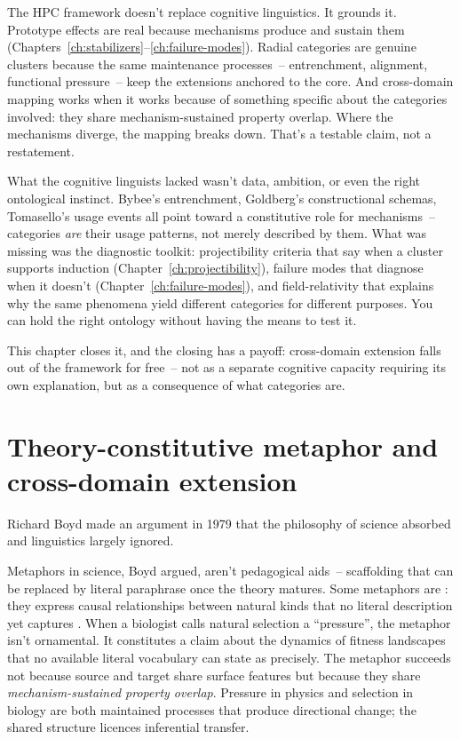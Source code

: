 The HPC framework doesn't replace cognitive linguistics. It grounds it. Prototype effects are real because mechanisms produce and sustain them (Chapters~\ref{ch:stabilizers}--\ref{ch:failure-modes}). Radial categories are genuine clusters because the same maintenance processes~-- entrenchment, alignment, functional pressure~-- keep the extensions anchored to the core. And cross-domain mapping works when it works because of something specific about the categories involved: they share mechanism-sustained property overlap. Where the mechanisms diverge, the mapping breaks down. That's a testable claim, not a restatement.

What the cognitive linguists lacked wasn't data, ambition, or even the right ontological instinct. Bybee's entrenchment, Goldberg's constructional schemas, Tomasello's usage events all point toward a constitutive role for mechanisms~-- categories \emph{are} their usage patterns, not merely described by them. What was missing was the diagnostic toolkit: projectibility criteria that say when a cluster supports induction (Chapter~\ref{ch:projectibility}), failure modes that diagnose when it doesn't (Chapter~\ref{ch:failure-modes}), and field-relativity that explains why the same phenomena yield different categories for different purposes. You can hold the right ontology without having the means to test it.

This chapter closes it, and the closing has a payoff: cross-domain extension falls out of the framework for free~-- not as a separate cognitive capacity requiring its own explanation, but as a consequence of what categories are.

\section{Theory-constitutive metaphor and cross-domain extension}
\label{sec:16c:tcm}

Richard Boyd made an argument in 1979 that the philosophy of science absorbed and linguistics largely ignored.

Metaphors in science, Boyd argued, aren't pedagogical aids~-- scaffolding that can be replaced by literal paraphrase once the theory matures. Some metaphors are : they express causal relationships between natural kinds that no literal description yet captures \citep{boyd1979}. When a biologist calls natural selection a \enquote{pressure}, the metaphor isn't ornamental. It constitutes a claim about the dynamics of fitness landscapes that no available literal vocabulary can state as precisely. The metaphor succeeds not because source and target share surface features but because they share \emph{mechanism-sustained property overlap}. Pressure in physics and selection in biology are both maintained processes that produce directional change; the shared structure licences inferential transfer.

